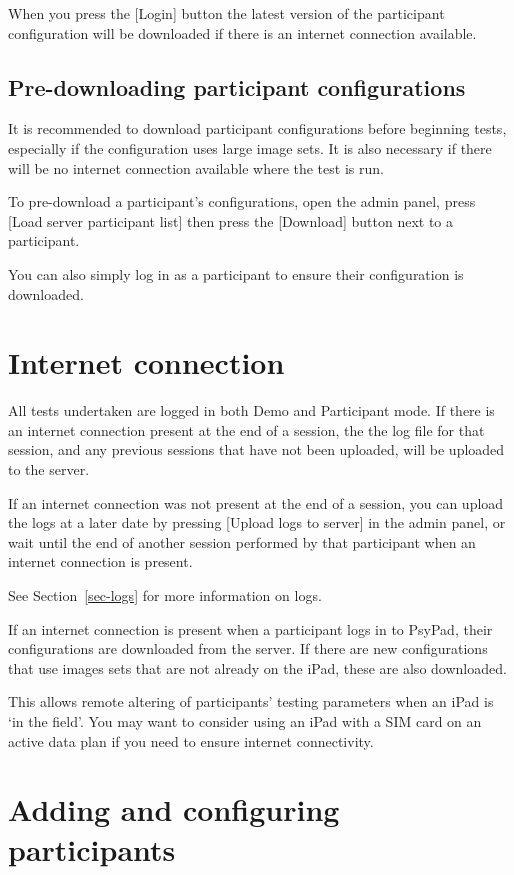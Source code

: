 \documentclass{article}
\begin{document}
When you press the [Login] button the latest version of the participant configuration will be downloaded if there is an internet connection available.

\subsection{Pre-downloading participant configurations}

It is recommended to download participant configurations before beginning tests,
especially if the configuration uses large image sets.
It is also necessary if there will be no internet connection available
where the test is run.

To pre-download a participant's configurations, open the admin panel, press 
[Load server participant list] then press the [Download] button next to a participant.

You can also simply log in as a participant to ensure their configuration is downloaded.

\section{Internet connection}

All tests undertaken are logged in both Demo and Participant mode.
If there is an internet connection present at the end of a session, the
the log file for that session, and any previous sessions that have not
been uploaded, will be uploaded to the server.

If an internet connection was not present at the end of a session, you
can upload the logs at a later date by pressing [Upload logs to server]
in the admin panel, or wait until the end of another session performed
by that participant when an internet connection is present.

See Section~\ref{sec-logs} for more information on logs.

If an internet connection is present when a participant logs in to
PsyPad, their configurations are downloaded from the server.
If there are new configurations that use images sets that are not
already on the iPad, these are also downloaded.

This allows remote altering of participants' testing parameters when an iPad is `in the field'. You may want to consider using an iPad with a SIM card on an active data plan if you need to ensure internet connectivity.

\section{Adding and configuring participants}
\label{sec-configuringParticipants}
\end{document}
